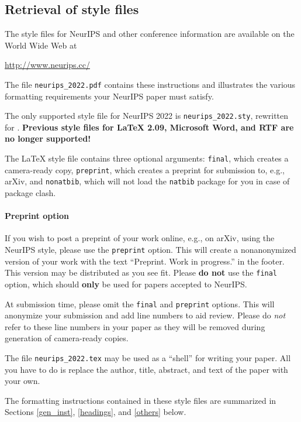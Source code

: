 \documentclass{article}
\begin{document}
\subsection{Retrieval of style files}


The style files for NeurIPS and other conference information are available on
the World Wide Web at
\begin{center}
  \url{http://www.neurips.cc/}
\end{center}
The file \verb+neurips_2022.pdf+ contains these instructions and illustrates the
various formatting requirements your NeurIPS paper must satisfy.


The only supported style file for NeurIPS 2022 is \verb+neurips_2022.sty+,
rewritten for \LaTeXe{}.  \textbf{Previous style files for \LaTeX{} 2.09,
  Microsoft Word, and RTF are no longer supported!}


The \LaTeX{} style file contains three optional arguments: \verb+final+, which
creates a camera-ready copy, \verb+preprint+, which creates a preprint for
submission to, e.g., arXiv, and \verb+nonatbib+, which will not load the
\verb+natbib+ package for you in case of package clash.


\paragraph{Preprint option}
If you wish to post a preprint of your work online, e.g., on arXiv, using the
NeurIPS style, please use the \verb+preprint+ option. This will create a
nonanonymized version of your work with the text ``Preprint. Work in progress.''
in the footer. This version may be distributed as you see fit. Please \textbf{do
  not} use the \verb+final+ option, which should \textbf{only} be used for
papers accepted to NeurIPS.


At submission time, please omit the \verb+final+ and \verb+preprint+
options. This will anonymize your submission and add line numbers to aid
review. Please do \emph{not} refer to these line numbers in your paper as they
will be removed during generation of camera-ready copies.


The file \verb+neurips_2022.tex+ may be used as a ``shell'' for writing your
paper. All you have to do is replace the author, title, abstract, and text of
the paper with your own.


The formatting instructions contained in these style files are summarized in
Sections \ref{gen_inst}, \ref{headings}, and \ref{others} below.
\end{document}
